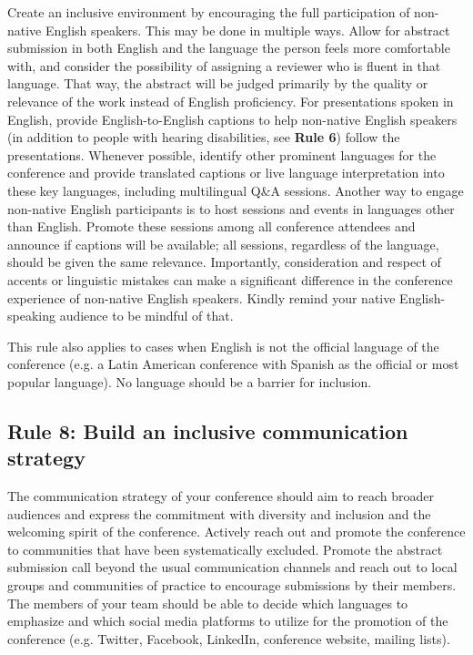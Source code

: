 \documentclass[10pt,letterpaper]{article}
\begin{document}
Create an inclusive environment by encouraging the full participation of non-native English speakers. This may be done in multiple ways.
Allow for abstract submission in both English and the language the person feels more comfortable with, and consider the possibility of assigning a reviewer who is fluent in that language. That way, the abstract will be judged primarily by the quality or relevance of the work instead of English proficiency.
For presentations spoken in English, provide English-to-English captions to help non-native English speakers (in addition to people with hearing disabilities, see \textbf{Rule 6}) follow the presentations. 
Whenever possible, identify other prominent languages for the conference and provide translated captions or live language interpretation into these key languages, including multilingual Q\&A sessions.
Another way to engage non-native English participants is to host sessions and events in languages other than English. 
Promote these sessions among all conference attendees and announce if captions will be available; all sessions, regardless of the language, should be given the same relevance.
Importantly, consideration and respect of accents or linguistic mistakes can make a significant difference in the conference experience of non-native English speakers. Kindly remind your native English-speaking audience to be mindful of that.

This rule also applies to cases when English is not the official language of the conference (e.g. a Latin American conference with Spanish as the official or most popular language). No language should be a barrier for inclusion. 



\subsection*{Rule 8: Build an inclusive communication strategy}
\label{rule_communication}

The communication strategy of your conference should aim to reach broader audiences and express the commitment with diversity and inclusion and the welcoming spirit of the conference.
Actively reach out and promote the conference to communities that have been systematically excluded. 
Promote the abstract submission call beyond the usual communication channels and reach out to local groups and communities of practice to encourage submissions by their members.
The members of your team should be able to decide which languages to emphasize and which social media platforms to utilize for the promotion of the conference (e.g. Twitter, Facebook, LinkedIn, conference website, mailing lists).%
\end{document}

